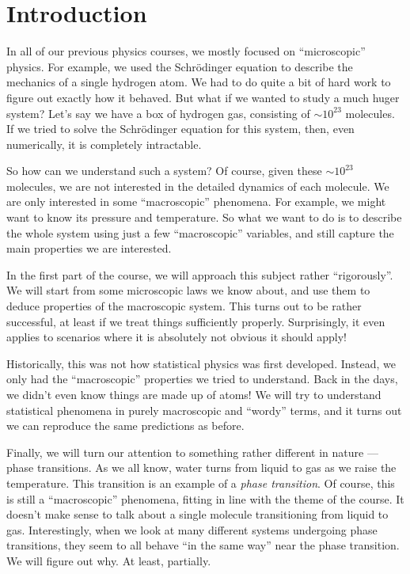 \documentclass[a4paper]{article}
\begin{document}
\section{Introduction}
In all of our previous physics courses, we mostly focused on ``microscopic'' physics. For example, we used the Schr\"odinger equation to describe the mechanics of a single hydrogen atom. We had to do quite a bit of hard work to figure out exactly how it behaved. But what if we wanted to study a much huger system? Let's say we have a box of hydrogen gas, consisting of $\sim 10^{23}$ molecules. If we tried to solve the Schr\"odinger equation for this system, then, even numerically, it is completely intractable.

So how can we understand such a system? Of course, given these $\sim 10^{23}$ molecules, we are not interested in the detailed dynamics of each molecule. We are only interested in some ``macroscopic'' phenomena. For example, we might want to know its pressure and temperature. So what we want to do is to describe the whole system using just a few ``macroscopic'' variables, and still capture the main properties we are interested.

In the first part of the course, we will approach this subject rather ``rigorously''. We will start from some microscopic laws we know about, and use them to deduce properties of the macroscopic system. This turns out to be rather successful, at least if we treat things sufficiently properly. Surprisingly, it even applies to scenarios where it is absolutely not obvious it should apply!

Historically, this was not how statistical physics was first developed. Instead, we only had the ``macroscopic'' properties we tried to understand. Back in the days, we didn't even know things are made up of atoms! We will try to understand statistical phenomena in purely macroscopic and ``wordy'' terms, and it turns out we can reproduce the same predictions as before.

Finally, we will turn our attention to something rather different in nature --- phase transitions. As we all know, water turns from liquid to gas as we raise the temperature. This transition is an example of a \emph{phase transition}. Of course, this is still a ``macroscopic'' phenomena, fitting in line with the theme of the course. It doesn't make sense to talk about a single molecule transitioning from liquid to gas. Interestingly, when we look at many different systems undergoing phase transitions, they seem to all behave ``in the same way'' near the phase transition. We will figure out why. At least, partially.
\end{document}

